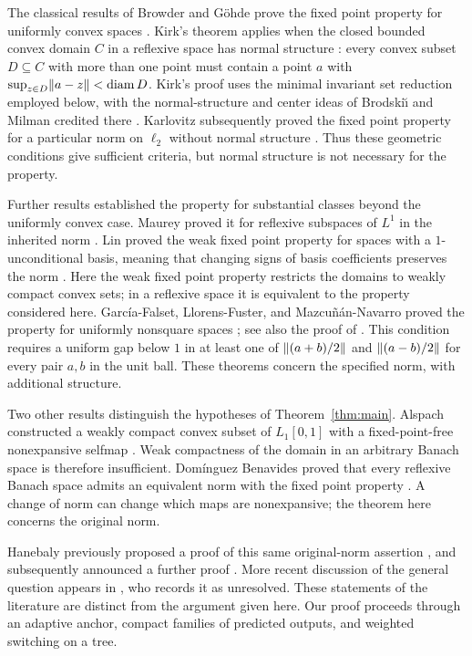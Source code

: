 The classical results of Browder and G\"ohde prove the fixed point
property for uniformly convex spaces
\cite{Browder1965,Gohde1965}. Kirk's theorem applies when the closed
bounded convex domain $C$ in a reflexive space has normal structure
\cite{Kirk1965}: every convex subset $D\subseteq C$ with more than one
point must contain a point $a$ with
$\sup_{z\in D}\lVert a-z\rVert<\operatorname{diam} D$.
Kirk's proof uses the minimal invariant set reduction employed below,
with the normal-structure and center ideas of Brodski\u\i{} and
Milman credited there \cite[p.~1004]{Kirk1965}.
Karlovitz subsequently proved the fixed point property for a particular
norm on $\ell_2$ without normal structure \cite{Karlovitz1976}.
Thus these geometric conditions give sufficient criteria, but normal
structure is not necessary for the property.

Further results established the property for substantial classes beyond
the uniformly convex case. Maurey proved it for reflexive subspaces of
$L^1$ in the inherited norm \cite[Theorem~1]{Maurey1981}.
Lin proved the weak fixed point property for spaces with a
$1$-unconditional basis, meaning that changing signs of basis coefficients
preserves the norm \cite[Theorem~1]{Lin1985}. Here the weak fixed point
property restricts the domains to weakly compact convex sets; in a
reflexive space it is equivalent to the property considered here.
Garc\'ia-Falset, Llorens-Fuster, and Mazcu\~n\'an-Navarro proved the
property for uniformly nonsquare spaces \cite{GarciaFalset2006}; see also
the proof of \citet{Dowling2008}. This condition requires a
uniform gap below $1$ in at least one of
$\lVert(a+b)/2\rVert$ and $\lVert(a-b)/2\rVert$ for every pair $a,b$ in the unit ball.
These theorems concern the specified norm, with additional structure.

Two other results distinguish the hypotheses of
Theorem~\ref{thm:main}. Alspach constructed a weakly compact convex
subset of $L_1[0,1]$ with a fixed-point-free nonexpansive selfmap
\cite{Alspach1981}. Weak compactness of the domain in an arbitrary
Banach space is therefore insufficient. Dom\'inguez Benavides proved
that every reflexive Banach space admits an equivalent norm with the
fixed point property \cite[Corollary~1]{Benavides2009}. A change of norm
can change which maps are nonexpansive; the theorem here concerns the
original norm.

Hanebaly previously proposed a proof of this same original-norm
assertion \cite[Theorem~1]{Hanebaly2019}, and subsequently announced
a further proof \cite{Hanebaly2021}. More recent discussion of the
general question appears in \citet[Section~1]{Nourouzi2026}, who
records it as unresolved. These statements of the literature are distinct
from the argument given here. Our proof proceeds through an adaptive
anchor, compact families of predicted outputs, and weighted switching
on a tree.

